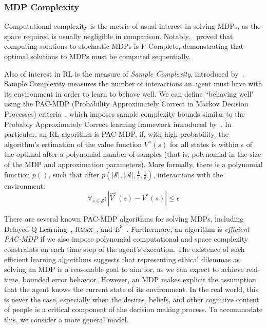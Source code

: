 \documentclass[11pt]{article}
\begin{document}
\subsubsection{MDP Complexity}

Computational complexity is the metric of usual interest in solving MDPs, as the space required is usually negligible in comparison. Notably,~\cite{papadimitriou1987complexity} proved that computing solutions to stochastic MDPs is P-Complete, demonstrating that optimal solutions to MDPs must be computed sequentially.

Also of interest in RL is the measure of {\it Sample Complexity}, introduced by~\cite{kakade2003sample}. Sample Complexity measures the number of interactions an agent must have with its environment in order to learn to behave well. We can define ``behaving well" using the PAC-MDP (Probability Approximately Correct in Markov Decision Processes) criteria~, which imposes sample complexity bounds similar to the Probably Approximately Correct learning framework introduced by~\cite{valiant1984theory}. In particular, an RL algorithm is PAC-MDP, if, with high probability, the algorithm's estimation of the value function $V^\pi(s)$ for all states is within $\epsilon$ of the optimal after a polynomial number of samples (that is, polynomial in the size of the MDP and approximation parameters). More formally, there is a polynomial function $p()$, such that after $p(|\mathcal{S}|, |\mathcal{A}|, \frac{1}{\epsilon}, \frac{1}{\delta})$, interactions with the environment:
\begin{equation}
\forall_{s \in \mathcal{S}} : |\hat{V}^\pi(s) - V^*(s)| \leq \epsilon
\end{equation}

There are several known PAC-MDP algorithms for solving MDPs, including Delayed-Q Learning~\cite{strehl2006pac}, \textsc{Rmax}~\cite{brafman2003r}, and $E^3$~\cite{kearns2002near}. Furthermore, an algorithm is {\it efficient PAC-MDP} if we also impose polynomial computational and space complexity constraints on each time step of the agent's execution. The existence of such efficient learning algorithms suggests that representing ethical dilemmas as solving an MDP is a reasonable goal to aim for, as we can expect to achieve real-time, bounded error behavior. However, an MDP makes explicit the assumption that the agent knows the current state of its environment. In the real world, this is never the case, especially when the desires, beliefs, and other cognitive content of people is a critical component of the decision making process. To accommodate this, we consider a more general model.
\end{document}
